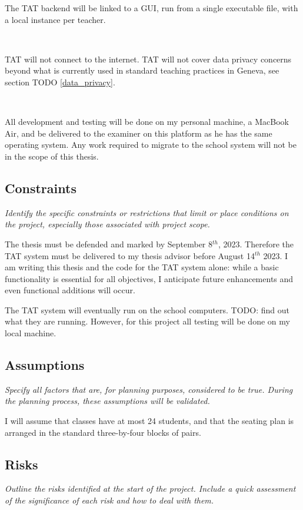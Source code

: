 \documentclass[10pt]{article}
\begin{document}
The TAT backend will be linked to a GUI, run from a single executable file, with a local instance per teacher.

\

TAT will not connect to the internet. TAT will not cover data privacy concerns beyond what is currently used in standard teaching practices in Geneva, see section TODO \ref{data_privacy}.

\

All development and testing will be done on my personal machine, a MacBook Air, and be delivered to the examiner on this platform as he has the same operating system. Any work required to migrate to the school system will not be in the scope of this thesis.

\subsection{Constraints} 
\emph{Identify the specific constraints or restrictions that limit or place conditions on the project, especially those associated with project scope.}

The thesis must be defended and marked by September 8$^{th}$, 2023. Therefore the TAT system must be delivered to my thesis advisor before August 14$^{th}$ 2023. I am writing this thesis and the code for the TAT system alone: while a basic functionality is essential for all objectives, I anticipate future enhancements and even functional additions will occur.

The TAT system will eventually run on the school computers. TODO: find out what they are running. However, for this project all testing will be done on my local machine.

\subsection{Assumptions} 
\emph{Specify all factors that are, for planning purposes, considered to be true. During the planning process, these assumptions will be validated.}

I will assume that classes have at most 24 students, and that the seating plan is arranged in the standard three-by-four blocks of pairs.

\subsection{Risks} 
\emph{Outline the risks identified at the start of the project. Include a quick assessment of the significance of each risk and how to deal with them.}
\end{document}

